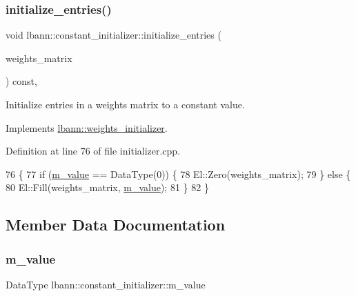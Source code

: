 \subsubsection{\texorpdfstring{initialize\+\_\+entries()}{initialize\_entries()}}
{\footnotesize\ttfamily void lbann\+::constant\+\_\+initializer\+::initialize\+\_\+entries (\begin{DoxyParamCaption}\item[{\hyperlink{base_8hpp_a9a697a504ae84010e7439ffec862b470}{Abs\+Dist\+Mat} \&}]{weights\+\_\+matrix }\end{DoxyParamCaption}) const\hspace{0.3cm}{\ttfamily [override]}, {\ttfamily [virtual]}}

Initialize entries in a weights matrix to a constant value. 

Implements \hyperlink{classlbann_1_1weights__initializer_a2ad6acf904c0c7bc7406dbd9851107be}{lbann\+::weights\+\_\+initializer}.



Definition at line 76 of file initializer.\+cpp.


\begin{DoxyCode}
76                                                                               \{
77   \textcolor{keywordflow}{if} (\hyperlink{classlbann_1_1constant__initializer_ac0f04ad951799fa970f3dea78988cdb5}{m\_value} == DataType(0)) \{
78     El::Zero(weights\_matrix);
79   \} \textcolor{keywordflow}{else} \{
80     El::Fill(weights\_matrix, \hyperlink{classlbann_1_1constant__initializer_ac0f04ad951799fa970f3dea78988cdb5}{m\_value});
81   \}
82 \}
\end{DoxyCode}


\subsection{Member Data Documentation}
\mbox{\label{classlbann_1_1constant__initializer_ac0f04ad951799fa970f3dea78988cdb5}} 
\subsubsection{\texorpdfstring{m\+\_\+value}{m\_value}}
{\footnotesize\ttfamily Data\+Type lbann\+::constant\+\_\+initializer\+::m\+\_\+value\hspace{0.3cm}{\ttfamily [private]}}

